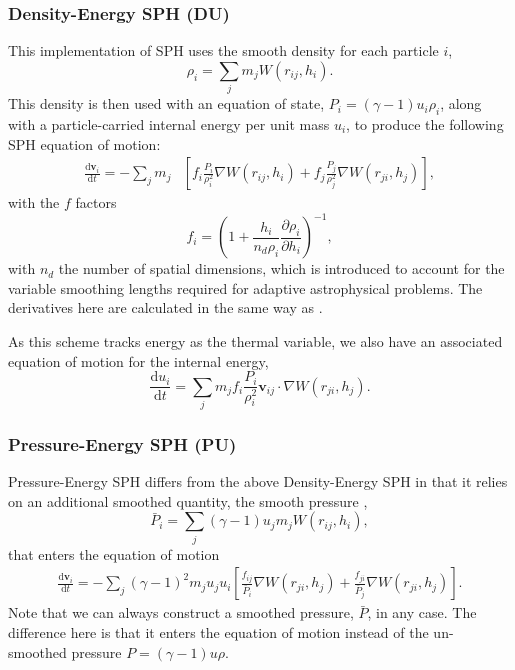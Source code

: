 \subsubsection{Density-Energy SPH (DU)}

This implementation of SPH uses the smooth density for each particle $i$,
\begin{equation}
    \rho_i = \sum_j m_j W(r_{ij}, h_i).
\end{equation}
This density is then used with an equation of state, $P_i = (\gamma - 1) u_i \rho_i$,
along with a particle-carried internal energy per unit mass $u_i$, to produce the
following SPH equation of motion:
\begin{align}
    \frac{\mathrm{d}\mathbf{v}_i}{\mathrm{d}t} = 
    - \sum_j m_j &\left[
        f_i \frac{P_i}{\rho_i^2} \nabla W(r_{ij}, h_i) +
        f_j \frac{P_j}{\rho_j^2} \nabla W(r_{ji}, h_j)
   \right],
\end{align}
with the $f$ factors
\begin{equation}
    f_i = \left(1 + \frac{h_i}{n_d \rho_i} \frac{\partial \rho_i}{\partial h_i}\right)^{-1},
\end{equation}
with $n_d$ the number of spatial dimensions, which is introduced to account
for the variable smoothing lengths required for adaptive astrophysical
problems. The derivatives here are calculated in the same way as \citet{Price2012}.

As this scheme tracks energy as the thermal variable, we also have an associated
equation of motion for the internal energy,
\begin{equation}
    \frac{\mathrm{d}u_i}{\mathrm{d}t} = \sum_j m_j f_i \frac{P_i}{\rho_i^2}
    \mathbf{v}_{ij} \cdot \nabla W(r_{ji}, h_j).
\end{equation}

\subsubsection{Pressure-Energy SPH (PU)}

Pressure-Energy SPH differs from the above Density-Energy SPH in that it
relies on an additional smoothed quantity, the smooth pressure
\citep{Hopkins2013},
\begin{equation}
    \bar{P}_i = \sum_j (\gamma - 1) u_j m_j W(r_{ij}, h_i),
    \label{eqn:smoothpressure}
\end{equation}
that enters the equation of motion
\begin{align}
    \frac{\mathrm{d} \mathbf{v}_i}{\mathrm{d} t} = -\sum_j (\gamma - 1)^2 m_j
    u_j u_i 
    \left[ \frac{f_{ij}}{\bar{P}_i} \nabla W(r_{ji}, h_j) +
    \frac{f_{ji}}{\bar{P}_j} \nabla W(r_{ji}, h_j)   \right].
    \label{eqn:pu_dvdt}
\end{align}
Note that we can always construct a smoothed pressure, $\bar{P}$, in any
case. The difference here is that it enters the equation of motion instead of
the un-smoothed pressure $P = (\gamma - 1) u \rho$.


